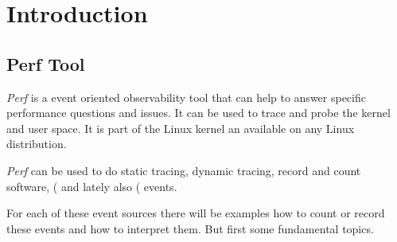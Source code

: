 \chapter{Introduction}
\section{Perf Tool}
{\em Perf} is a event oriented observability tool that can help to
answer specific performance questions and issues. It can be used
to trace and probe the kernel and user space. It is part of the
Linux kernel an available on any Linux distribution.

{\em Perf} can be used to do static tracing, dynamic tracing, record
and count software,  (\PMU\) and
lately also  (\eBPF\) events.

For each of these event sources there will be examples how to count or
record these events and how to interpret them. But first some
fundamental topics.
